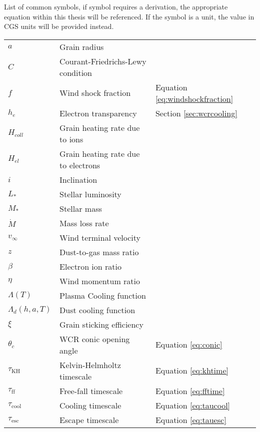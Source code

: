 \begin{Common_Symbols}

List of common symbols, if symbol requires a derivation, the appropriate equation within this thesis will be referenced. If the symbol is a unit, the value in CGS units will be provided instead. 

\begin{longtable}[c]{l|l|l}
  \hline
  \endhead
  \hline
  \endfoot




  $a$ & Grain radius & \\
  $C$ & Courant-Friedrichs-Lewy condition & \\
  $f$ & Wind shock fraction & Equation \ref{eq:windshockfraction} \\
  $h_e$ & Electron transparency & Section \ref{sec:wcrcooling} \\
  $H_{coll}$ & Grain heating rate due to ions & \\
  $H_{el}$ & Grain heating rate due to electrons & \\
  $i$ & Inclination & \\
  $L_*$ & Stellar luminosity & \\
  $M_*$ & Stellar mass & \\
  $\dot M$ & Mass loss rate & \\
  $v_\infty$ & Wind terminal velocity & \\
  $z$ & Dust-to-gas mass ratio  & \\


  $\beta$ & Electron ion ratio & \\
  $\eta$ & Wind momentum ratio  & \\
  
  $\Lambda(T)$ & Plasma Cooling function & \\
  $\Lambda_d(h,a,T)$ & Dust cooling function & \\

  $\xi$ & Grain sticking efficiency & \\

  $\theta_c$ & WCR conic opening angle & Equation \ref{eq:conic} \\
  
  $\tau_\text{KH}$ & Kelvin-Helmholtz timescale & Equation \ref{eq:khtime} \\
  $\tau_\text{ff}$ & Free-fall timescale & Equation \ref{eq:fftime} \\
  $\tau_\text{cool}$ & Cooling timescale & Equation \ref{eq:taucool} \\
  $\tau_\text{esc}$ & Escape timescale & Equation \ref{eq:tauesc} \\


\end{longtable}
\end{Common_Symbols}
